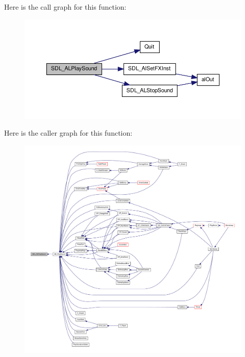 Here is the call graph for this function:
\nopagebreak
\begin{figure}[H]
\begin{center}
\leavevmode
\includegraphics[width=396pt]{ID__SD_8C_a45e2c8d00474ded03c3203bb310089c4_cgraph}
\end{center}
\end{figure}




Here is the caller graph for this function:
\nopagebreak
\begin{figure}[H]
\begin{center}
\leavevmode
\includegraphics[width=400pt]{ID__SD_8C_a45e2c8d00474ded03c3203bb310089c4_icgraph}
\end{center}
\end{figure}


